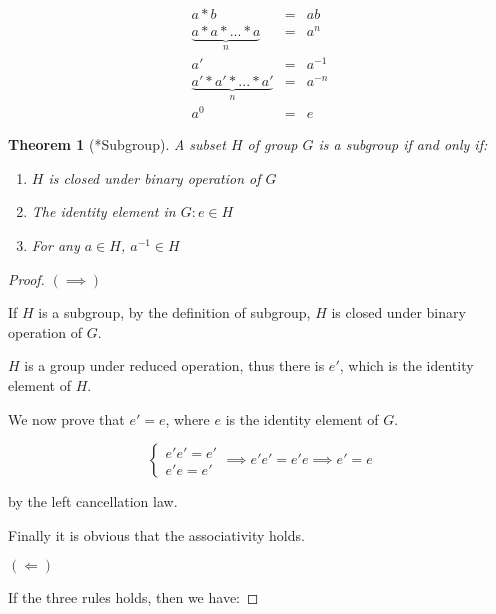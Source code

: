\documentclass{article}
\theoremstyle{MyNonumberplain}
\theoremstyle{break}
\newtheorem*{proof}{Proof. }
\theoremstyle{break}
\newtheorem{theorem}{Theorem}[section]
\theoremstyle{break}
\theoremstyle{definition}
\theoremstyle{break}
\begin{document}
\begin{eqnarray}
    a*b & = & ab \nonumber\\
    \underbrace{a*a*...*a}_{n} & = & a^n \nonumber\\
    a' & = & a^{-1} \nonumber\\
    \underbrace{a'*a'*...*a'}_{n} & = & a^{-n} \nonumber\\
    a^0 & = & e \nonumber
\end{eqnarray}

\begin{thmbox}
    \begin{theorem}[*Subgroup]
        A subset $H$ of group $G$ is a subgroup if and only if:\bigskip
        \begin{enumerate}
            \item $H$ is closed under binary operation of $G$\bigskip
            \item The identity element in $G: e\in H$\bigskip
            \item For any $a\in H$, $a^{-1}\in H$\bigskip
        \end{enumerate}
    \end{theorem}
    \begin{prfbox}
        \begin{proof}
            $(\implies)$\bigskip

            If $H$ is a subgroup, by the definition of subgroup, $H$ is closed under
            binary operation of $G$.\bigskip
    
            $H$ is a group under reduced operation, thus there is $e'$, which is the
            identity element of $H$. \bigskip
            
            We now prove that $e' = e$, where $e$ is the identity element of $G$.\bigskip
    
            \[ \left\{\begin{array}{l}
                e' e' = e'\\
                e' e = e'
            \end{array}\right. \implies e' e' = e' e \implies e' = e \]\bigskip
    
            by the left cancellation law.\bigskip
    
            Finally it is obvious that the associativity holds.\bigskip
    
            $(\Longleftarrow)$\bigskip

            If the three rules holds, then we have:\bigskip
    

\end{proof}
\end{prfbox}
\end{thmbox}
\end{document}
